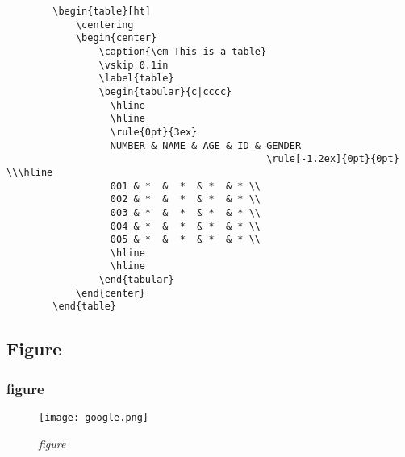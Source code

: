 \documentclass[a4paper, 12pt]{article}
\begin{document}
\begin{listing}[ht]
    \begin{verbatim}
        \begin{table}[ht]
            \centering
            \begin{center}
                \caption{\em This is a table}
                \vskip 0.1in
                \label{table}
                \begin{tabular}{c|cccc}
                  \hline
                  \hline
                  \rule{0pt}{3ex}
                  NUMBER & NAME & AGE & ID & GENDER 
                                             \rule[-1.2ex]{0pt}{0pt} \\\hline
                  001 & *  &  *  & *  & * \\ 
                  002 & *  &  *  & *  & * \\
                  003 & *  &  *  & *  & * \\      
                  004 & *  &  *  & *  & * \\
                  005 & *  &  *  & *  & * \\
                  \hline
                  \hline 
                \end{tabular}
            \end{center}
        \end{table}
    \end{verbatim}
    \caption{\em Table}
    \label{table}
\end{listing}

\clearpage
\subsection{Figure}

\subsubsection{figure}
\begin{figure}[H]
    \centering \texttt{[image: google.png]}
    \caption{\em figure}
    \label{fig:mesh}
\end{figure}
\end{document}
